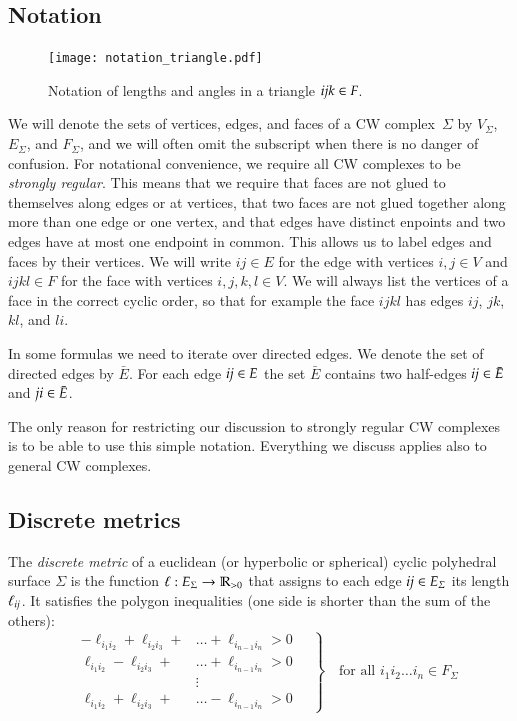 \documentclass[Thesis]{subfiles}
\begin{document}
\subsection{Notation}

\begin{figure}
\centering
\texttt{[image: notation\_triangle.pdf]}
\caption{Notation of lengths and angles in a triangle $\it ijk \in F$.}
\label{fig:triangle_notation}	
\end{figure}

We will denote the sets of vertices, edges, and faces of a CW
complex~$\Sigma$ by $V_{\Sigma}$, $E_{\Sigma}$, and $F_{\Sigma}$, and
we will often omit the subscript when there is no danger of confusion.
For notational convenience, we require all CW complexes to be
\emph{strongly regular}. This means that we require that faces are not
glued to themselves along edges or at vertices, that two faces are not
glued together along more than one edge or one vertex, and that edges
have distinct enpoints and two edges have at most one endpoint in
common. This allows us to label edges and faces by their vertices. We
will write $\mathit{ij}\in E$ for the edge with vertices $i,j\in V$ and
$\mathit{ijkl}\in F$ for the face with vertices $i,j,k,l\in V$. We will always
list the vertices of a face in the correct cyclic order, so that for
example the face $\mathit{ijkl}$ has edges $\mathit{ij}$, $\mathit{jk}$,
$\mathit{kl}$, and $\mathit{li}$.

In some formulas we need to iterate over directed edges. We denote the set 
of directed edges by $\bar E$. For each edge $\it ij\in E$ the set $\bar E$
contains two half-edges $\it ij\in \bar E$ and $\it ji \in \bar E$.

The only reason for restricting our discussion to strongly regular CW
complexes is to be able to use this simple notation. Everything we
discuss applies also to general CW complexes.

\subsection{Discrete metrics}
\label{sec:discrete-metrics}

The \emph{discrete metric} of a euclidean (or hyperbolic or spherical) cyclic polyhedral surface $\Sigma$ is the function $\ell:E_{\Sigma}\rightarrow\mathbb R_{>0}$ that assigns to each edge $\it ij \in E_{\Sigma}$ its
length $\ell_{\it ij}$. 
It satisfies the polygon inequalities (one side is shorter than the sum of the others):
\begin{equation}
\label{eq:polygon_ineq}
\left.
\quad
\begin{aligned}
-\ell_{i_{1}i_{2}}+\ell_{i_{2}i_{3}}+&\ldots+\ell_{i_{n-1}i_{n}}
>0\\
\ell_{i_{1}i_{2}}-\ell_{i_{2}i_{3}}+&\ldots+\ell_{i_{n-1}i_{n}}
>0\\
&\vdots\\
\ell_{i_{1}i_{2}}+\ell_{i_{2}i_{3}}+&\ldots-\ell_{i_{n-1}i_{n}}
>0
\end{aligned}
\quad
\right\}
\quad
\text{for all $i_{1}i_{2}\ldots i_{n}\in F_{\Sigma}$}
\end{equation}
\end{document}

